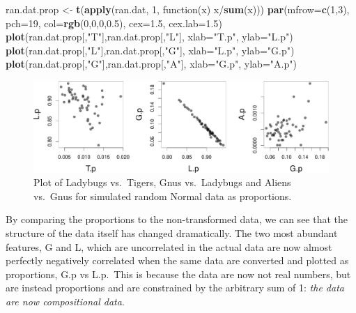 \documentclass[twocolumn]{article}
\newenvironment{Shaded}{\begin{snugshade}}{\end{snugshade}}
\newcommand{\KeywordTok}[1]{\textcolor[rgb]{0.13,0.29,0.53}{\textbf{{#1}}}}
\newcommand{\DataTypeTok}[1]{\textcolor[rgb]{0.13,0.29,0.53}{{#1}}}
\newcommand{\DecValTok}[1]{\textcolor[rgb]{0.00,0.00,0.81}{{#1}}}
\newcommand{\FloatTok}[1]{\textcolor[rgb]{0.00,0.00,0.81}{{#1}}}
\newcommand{\StringTok}[1]{\textcolor[rgb]{0.31,0.60,0.02}{{#1}}}
\newcommand{\NormalTok}[1]{{#1}}
\begin{document}
\begin{Shaded}
\begin{Highlighting}[]
\NormalTok{ran.dat.prop <-}\StringTok{ }\KeywordTok{t}\NormalTok{(}\KeywordTok{apply}\NormalTok{(ran.dat, }\DecValTok{1}\NormalTok{,}
    \NormalTok{function(x) x/}\KeywordTok{sum}\NormalTok{(x)))}
\KeywordTok{par}\NormalTok{(}\DataTypeTok{mfrow=}\KeywordTok{c}\NormalTok{(}\DecValTok{1}\NormalTok{,}\DecValTok{3}\NormalTok{), }\DataTypeTok{pch=}\DecValTok{19}\NormalTok{, }\DataTypeTok{col=}\KeywordTok{rgb}\NormalTok{(}\DecValTok{0}\NormalTok{,}\DecValTok{0}\NormalTok{,}\DecValTok{0}\NormalTok{,}\FloatTok{0.5}\NormalTok{),}
    \DataTypeTok{cex=}\FloatTok{1.5}\NormalTok{, }\DataTypeTok{cex.lab=}\FloatTok{1.5}\NormalTok{)}
\KeywordTok{plot}\NormalTok{(ran.dat.prop[,}\StringTok{"T"}\NormalTok{],ran.dat.prop[,}\StringTok{"L"}\NormalTok{],}
    \DataTypeTok{xlab=}\StringTok{"T.p"}\NormalTok{, }\DataTypeTok{ylab=}\StringTok{"L.p"}\NormalTok{)}
\KeywordTok{plot}\NormalTok{(ran.dat.prop[,}\StringTok{"L"}\NormalTok{],ran.dat.prop[,}\StringTok{"G"}\NormalTok{],}
    \DataTypeTok{xlab=}\StringTok{"L.p"}\NormalTok{, }\DataTypeTok{ylab=}\StringTok{"G.p"}\NormalTok{)}
\KeywordTok{plot}\NormalTok{(ran.dat.prop[,}\StringTok{"G"}\NormalTok{],ran.dat.prop[,}\StringTok{"A"}\NormalTok{],}
    \DataTypeTok{xlab=}\StringTok{"G.p"}\NormalTok{, }\DataTypeTok{ylab=}\StringTok{"A.p"}\NormalTok{)}
\end{Highlighting}
\end{Shaded}

\begin{figure}[htbp]
\centering
\includegraphics{main_files/figure-latex/R_block_TSS-1.pdf}
\caption{\label{numbers} Plot of Ladybugs vs.~Tigers, Gnus vs.~Ladybugs
and Aliens vs.~Gnus for simulated random Normal data as proportions.}
\end{figure}

By comparing the proportions to the non-transformed data, we can see
that the structure of the data itself has changed dramatically. The two
most abundant features, G and L, which are uncorrelated in the actual
data are now almost perfectly negatively correlated when the same data
are converted and plotted as proportions, G.p vs L.p.~This is because
the data are now not real numbers, but are instead proportions and are
constrained by the arbitrary sum of 1:
\emph{the data are now compositional data}.
\end{document}
